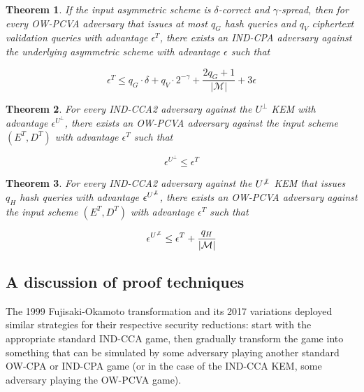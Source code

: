 \documentclass{article}
\newcommand{\norm}[1]{\vert {#1} \vert}
\newtheorem{theorem}{Theorem}[section]
\begin{document}
\begin{theorem}\label{ow-pcva-result}
    If the input asymmetric scheme is $\delta$-correct and $\gamma$-spread, then for every OW-PCVA adversary that issues at most $q_G$ hash queries and $q_V$ ciphertext validation queries with advantage $\epsilon^T$, there exists an IND-CPA adversary against the underlying asymmetric scheme with advantage $\epsilon$ such that

    \begin{equation*}
        \epsilon^T \leq q_G \cdot \delta + q_V \cdot 2^{-\gamma} 
            + \frac{2q_G + 1}{\norm{\mathcal{M}}}
            + 3\epsilon
    \end{equation*}
\end{theorem}

\begin{theorem}\label{cca-kem-result}
    For every IND-CCA2 adversary against the $U^\bot$ KEM with advantage $\epsilon^{U^\bot}$, there exists an OW-PCVA adversary against the input scheme $(E^T, D^T)$ with advantage $\epsilon^T$ such that

    \begin{equation*}
        \epsilon^{U^\bot} \leq \epsilon^T
    \end{equation*}
\end{theorem}

\begin{theorem}
    For every IND-CCA2 adversary against the $U^{\not\bot}$ KEM that issues $q_H$ hash queries with advantage $\epsilon^{U^{\not\bot}}$, there exists an OW-PCVA adversary against the input scheme $(E^T, D^T)$ with advantage $\epsilon^T$ such that

    \begin{equation*}
        \epsilon^{U^{\not\bot}} \leq \epsilon^T + \frac{q_H}{\norm{\mathcal{M}}}
    \end{equation*}
\end{theorem}

\subsection{A discussion of proof techniques}
The 1999 Fujisaki-Okamoto transformation and its 2017 variations deployed similar strategies for their respective security reductions: start with the appropriate standard IND-CCA game, then gradually transform the game into something that can be simulated by some adversary playing another standard OW-CPA or IND-CPA game (or in the case of the IND-CCA KEM, some adversary playing the OW-PCVA game).
\end{document}

